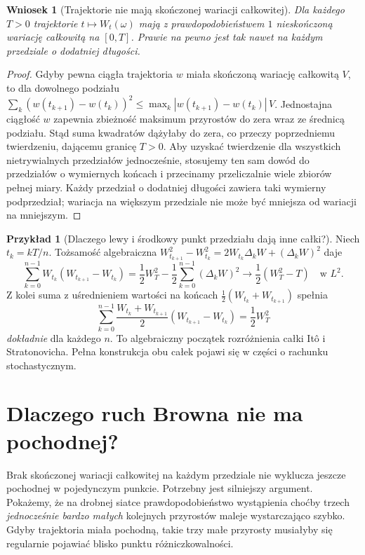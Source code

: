 \documentclass[11pt,a4paper,oneside]{report}
\numberwithin{equation}{chapter}
\theoremstyle{plain}
\newtheorem{wniosek}[twierdzenie]{Wniosek}
\theoremstyle{definition}
\newtheorem{przyklad}{Przykład}[chapter]
\theoremstyle{remark}
\begin{document}
\begin{wniosek}[Trajektorie nie mają skończonej wariacji całkowitej]
Dla każdego $T>0$ trajektorie $t\mapsto W_t(\omega)$
mają z prawdopodobieństwem $1$ nieskończoną wariację
całkowitą na $[0,T]$. Prawie na pewno jest tak nawet
na każdym przedziale o dodatniej długości.
\end{wniosek}
\begin{proof}
Gdyby pewna ciągła trajektoria $w$ miała skończoną
wariację całkowitą $V$, to dla dowolnego podziału
$\sum_k(w(t_{k+1})-w(t_k))^2
\le\max_k|w(t_{k+1})-w(t_k)|\,V$.
Jednostajna ciągłość $w$ zapewnia zbieżność maksimum
przyrostów do zera wraz ze średnicą podziału.
Stąd suma kwadratów dążyłaby do zera, co przeczy
poprzedniemu twierdzeniu, dającemu granicę $T>0$.
Aby uzyskać twierdzenie dla wszystkich nietrywialnych
przedziałów jednocześnie, stosujemy ten sam dowód do
przedziałów o wymiernych końcach i przecinamy
przeliczalnie wiele zbiorów pełnej miary.
Każdy przedział o dodatniej długości zawiera taki
wymierny podprzedział; wariacja na większym przedziale
nie może być mniejsza od wariacji na mniejszym.
\end{proof}

\begin{przyklad}[Dlaczego lewy i środkowy punkt przedziału dają inne całki?]
Niech $t_k=kT/n$. Tożsamość algebraiczna
$W_{t_{k+1}}^2-W_{t_k}^2
=2W_{t_k}\Delta_kW+(\Delta_kW)^2$
daje
\[
\sum_{k=0}^{n-1}W_{t_k}(W_{t_{k+1}}-W_{t_k})
=\frac12W_T^2-\frac12\sum_{k=0}^{n-1}(\Delta_kW)^2
\longrightarrow \frac12(W_T^2-T)
\quad\text{w }L^2.
\]
Z kolei suma z uśrednieniem wartości na końcach
$\frac12(W_{t_k}+W_{t_{k+1}})$ spełnia
\[
\sum_{k=0}^{n-1}\frac{W_{t_k}+W_{t_{k+1}}}{2}
 (W_{t_{k+1}}-W_{t_k})=\frac12W_T^2
\]
\emph{dokładnie} dla każdego $n$.
To algebraiczny początek rozróżnienia całki Itô i
Stratonovicha. Pełna konstrukcja obu całek pojawi
się w części o rachunku stochastycznym.
\end{przyklad}

\section{Dlaczego ruch Browna nie ma pochodnej?}
Brak skończonej wariacji całkowitej na każdym przedziale nie
wyklucza jeszcze pochodnej w pojedynczym punkcie. Potrzebny
jest silniejszy argument. Pokażemy, że na drobnej siatce
prawdopodobieństwo wystąpienia choćby trzech \emph{jednocześnie
bardzo małych} kolejnych przyrostów maleje wystarczająco szybko.
Gdyby trajektoria miała pochodną, takie trzy małe przyrosty
musiałyby się regularnie pojawiać blisko punktu różniczkowalności.
\end{document}
